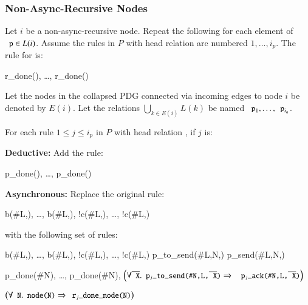 \subsubsection{Non-Async-Recursive Nodes}
\label{sec:nonasyncrecursive}

Let $i$ be a non-async-recursive node.  Repeat the following for each element of $\dedalus{p} \in L(i)$.
Assume the rules in $P$ with head relation
 are numbered $1, \ldots, i_p$.  The rule for 
is:

\begin{Drules}
        {r_done(), \ldots, r_done()}
\end{Drules}

Let the nodes in the collapsed PDG connected via incoming edges to node $i$ be denoted by $E(i)$.  Let the relations $\bigcup_{k \in E(i)} L(k)$ be named $\dedalus{p}_1, \ldots, \dedalus{p}_{i_q}$.

For each rule $1 \leq j \leq i_p$ in $P$ with head relation , if $j$ is:

\noindent
\textbf{Deductive:}
Add the rule:

\begin{Drules}
        {p_done(), \ldots, p_done()}
\end{Drules}

\noindent
\textbf{Asynchronous:}
Replace the original rule:

\begin{Drules}
        {b(#L,), \ldots, b(#L,), !c(#L,), \ldots, !c(#L,)}
\end{Drules}

with the following set of rules:

\begin{Drules}
      {b(#L,), \ldots, b(#L,), !c(#L,), \ldots, !c(#L,)}
      {p_to_send(#L,N,)}
      {p_send(#L,N,)}

      {p_done(#N), \ldots, p_done(#N), \(\left(\forall \od{X} . \dedalus{p\sub{j}_to_send(#N,L,\od{X})} \Rightarrow \right.\) \(\left. \dedalus{p\sub{j}_ack(#N,L,\od{X})}\right)\)}

      {\(\left(\forall \dedalus{N} . \dedalus{node(N)} \Rightarrow \dedalus{r\sub{j}_done_node(N)}\right)\)}
\end{Drules}

